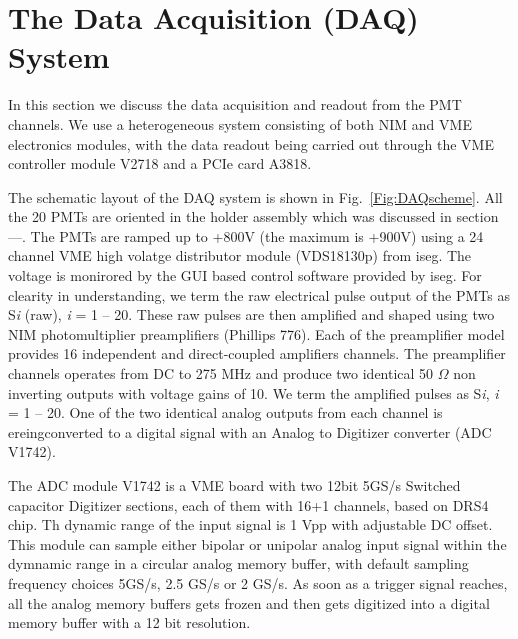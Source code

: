 \section{The Data Acquisition (DAQ) System }
\label{sec:DAQ}


In this section we discuss the data acquisition and readout from the PMT 
channels. We use a heterogeneous system consisting of both 
NIM and VME electronics modules, with the data readout being carried out through 
the VME controller module V2718 and a PCIe card A3818. 

The schematic layout 
of the DAQ system is shown in Fig.~{\ref{Fig:DAQscheme}}. All the 20 PMTs 
are oriented in the holder assembly which was discussed in section---. 
The PMTs are ramped up to +800V (the maximum is +900V) using a 24 channel 
VME high volatge distributor module (VDS18130p) from iseg. The voltage is 
monirored by the GUI based control software provided by iseg. 
For clearity in understanding, we term the raw electrical pulse output of 
the PMTs as S{\it i} (raw), {\it i} = 1 -- 20. These raw pulses are then 
amplified and shaped using two NIM photomultiplier preamplifiers (Phillips 776). 
Each of the preamplifier model provides 16 independent  and direct-coupled 
amplifiers channels. The preamplifier channels operates from DC to 275 MHz and 
produce two identical 50 $\Omega$ non inverting outputs with voltage gains of 10. 
We term the amplified pulses as S{\it i}, {\it i} = 1 -- 20. One of the 
two identical analog outputs from each channel is ereingconverted to a digital 
signal with an Analog to Digitizer converter (ADC V1742). 

The ADC module V1742 
is a VME board with two 12bit 5GS/s Switched capacitor Digitizer sections, 
each of them with 16+1 channels, based on DRS4 chip. Th dynamic range of the input 
signal is 1 Vpp with adjustable DC offset. This module can sample either bipolar or 
unipolar analog input signal within the dymnamic range in a circular 
analog memory buffer, with default sampling frequency choices 5GS/s, 2.5 GS/s 
or 2 GS/s. As soon as a trigger signal reaches, all the analog memory 
buffers gets frozen and then gets digitized into a digital memory buffer 
with a 12 bit resolution. 

